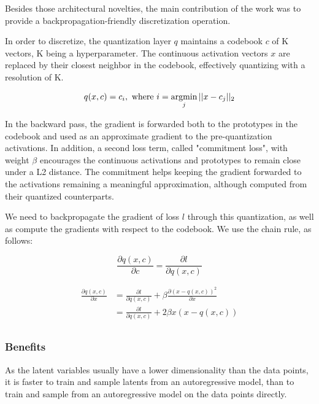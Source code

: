 Besides those architectural novelties, the main contribution of the work was to provide a backpropagation-friendly discretization operation.

In order to discretize, the quantization layer $q$ maintains a codebook $c$ of K vectors, K being a hyperparameter. The continuous activation vectors $x$ are replaced by their closest neighbor in the codebook, effectively quantizing with a resolution of K.

\begin{equation}
    q(x, c)=c_i, \text{ where  } i= \operatorname*{argmin}_j ||x - c_j||_2
\end{equation}

In the backward pass, the gradient is forwarded both to the prototypes in the codebook and used as an approximate gradient to the pre-quantization activations. In addition, a second loss term, called "commitment loss", with weight $\beta$ encourages the continuous activations and prototypes to remain close under a L2 distance. The commitment helps keeping the gradient forwarded to the activations remaining a meaningful approximation, although computed from their quantized counterparts.

We need to backpropagate the gradient of loss $l$ through this quantization, as well as compute the gradients with respect to the codebook. We use the chain rule, as follows:

\begin{equation}
    \frac{\partial q(x, c)}{\partial c} = \frac{\partial l}{\partial q(x, c)}
\end{equation}

\begin{equation}
\begin{split}
    \frac{\partial q(x, c)}{\partial x} &= \frac{\partial l}{\partial q(x, c)} + \beta \frac{\partial (x - q(x, c))^2}{\partial x} \\
    & = \frac{\partial l}{\partial q(x, c)} + 2\beta x(x - q(x, c)) \\
\end{split}
\end{equation}

\subsubsection{Benefits}

As the latent variables usually have a lower dimensionality than the data points, it is faster to train and sample latents from an autoregressive model, than to train and sample from an autoregressive model on the data points directly.

